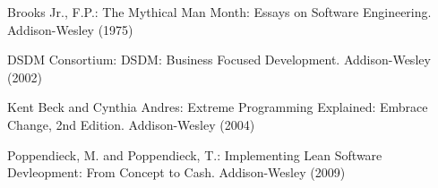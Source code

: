 \documentclass[lnbip]{svmultln}
\begin{document}
%
%
\begin{thebibliography}{5}

 Brooks Jr., F.P.: The Mythical Man Month: Essays
  on Software Engineering. Addison-Wesley (1975)

 DSDM Consortium: DSDM: Business Focused
  Development. Addison-Wesley (2002)
  
 Kent Beck and Cynthia Andres: Extreme Programming Explained: Embrace Change, 2nd Edition. Addison-Wesley (2004)  




 Poppendieck, M. and Poppendieck, T.:
  Implementing Lean Software Devleopment: From Concept to
  Cash. Addison-Wesley (2009)

\end{thebibliography}
%
\end{document}

